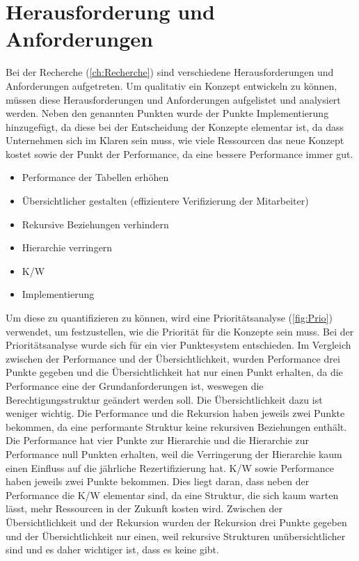 \section{Herausforderung und Anforderungen}
\label{sec:chapter04:Herausforderung}
Bei der Recherche (\ref{ch:Recherche}) sind verschiedene Herausforderungen und Anforderungen aufgetreten.
Um qualitativ ein Konzept entwickeln zu können, müssen diese Herausforderungen und Anforderungen aufgelistet und analysiert werden.
Neben den genannten Punkten wurde der Punkte Implementierung hinzugefügt, da diese bei der Entscheidung der Konzepte elementar ist, da dass Unternehmen sich im Klaren sein muss, wie viele Ressourcen das neue Konzept kostet sowie der Punkt der Performance, da eine bessere Performance immer gut.
\begin{itemize}
	\item Performance der Tabellen erhöhen 
	\item Übersichtlicher gestalten (effizientere Verifizierung der Mitarbeiter)
	\item Rekursive Beziehungen verhindern
	\item Hierarchie verringern
	\item \ac{K/W}
	\item Implementierung
\end{itemize}
Um diese zu quantifizieren zu können, wird eine Prioritätsanalyse (\ref{fig:Prio}) verwendet, um festzustellen, wie die Priorität für die Konzepte sein muss. \cite{BdIufH}
Bei der Prioritätsanalyse wurde sich für ein vier Punktesystem entschieden.
\newline
Im Vergleich zwischen der Performance und der Übersichtlichkeit, wurden Performance drei Punkte gegeben und die Übersichtlichkeit hat nur einen Punkt erhalten, da die Performance eine der Grundanforderungen ist, weswegen die Berechtigungsstruktur geändert werden soll.
Die Übersichtlichkeit dazu ist weniger wichtig.
Die Performance und die Rekursion haben jeweils zwei Punkte bekommen, da eine performante Struktur keine rekursiven Beziehungen enthält.
Die Performance hat vier Punkte zur Hierarchie und die Hierarchie zur Performance null Punkten erhalten, weil die Verringerung der Hierarchie kaum einen Einfluss auf die jährliche Rezertifizierung hat. 
\ac{K/W} sowie Performance haben jeweils zwei Punkte bekommen.
Dies liegt daran, dass neben der Performance die \ac{K/W} elementar sind, da eine Struktur, die sich kaum warten lässt, mehr Ressourcen in der Zukunft kosten wird.
Zwischen der Übersichtlichkeit und der Rekursion wurden der Rekursion drei Punkte gegeben und der Übersichtlichkeit nur einen, weil rekursive Strukturen unübersichtlicher sind und es daher wichtiger ist, dass es keine gibt.

